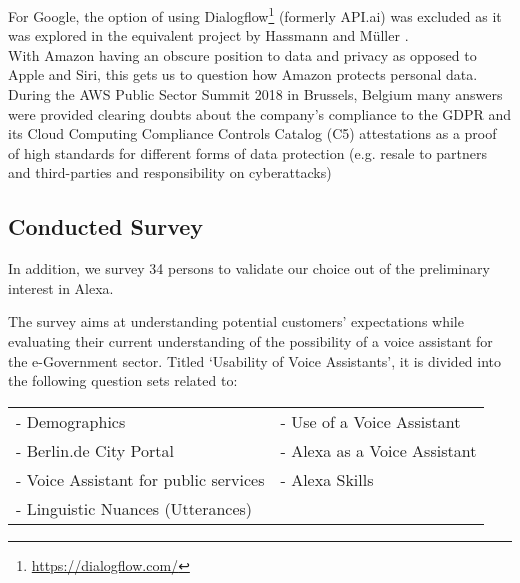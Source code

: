 For Google, the option of using Dialogflow\footnote{\url{https://dialogflow.com/}} (formerly API.ai) was excluded as it was explored in the equivalent project by Hassmann and Müller \cite{hassmannMlr:berlina}.\\



With Amazon having an obscure position to data and privacy as opposed to Apple and Siri, this gets us to question how Amazon protects personal data. During the AWS Public Sector Summit 2018 in Brussels, Belgium many answers were provided clearing doubts about the company's compliance to the GDPR and its Cloud Computing Compliance Controls Catalog (C5) attestations as a proof of high standards for different forms of data protection (e.g. resale to partners and third-parties and responsibility on cyberattacks) \cite{aws:pubsecsum}


\subsection*{Conducted Survey}

In addition, we  survey 34 persons to validate our choice out of the preliminary interest in Alexa. 


The survey aims at understanding potential customers' expectations while evaluating their current understanding of the possibility of a voice assistant for the e-Government sector. Titled `Usability of Voice Assistants', it is divided into the following question sets related to:

%





\begin{table}[H]
	\begin{tabular} {l l}
		
		
- Demographics &
-	Use of a Voice Assistant \\	  
-	Berlin.de City Portal &
- 	Alexa as a Voice Assistant \\
-	Voice Assistant for public services  &
 -	Alexa Skills \\
-	Linguistic Nuances (Utterances)\\
	\end{tabular}
\end{table}
%
%
%
%
%
%		


